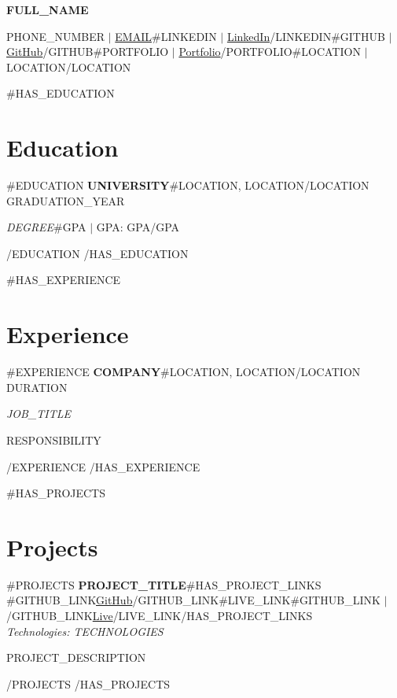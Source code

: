 \documentclass[10pt,letterpaper]{article}
\begin{document}
\begin{center}
{\Large \textbf{\uppercase{{{FULL_NAME}}}}}

\vspace{2pt}
{\small {{PHONE_NUMBER}} $|$ \href{mailto:{{EMAIL}}}{{{EMAIL}}}{{#LINKEDIN}} $|$ \href{{{LINKEDIN}}}{LinkedIn}{{/LINKEDIN}}{{#GITHUB}} $|$ \href{{{GITHUB}}}{GitHub}{{/GITHUB}}{{#PORTFOLIO}} $|$ \href{{{PORTFOLIO}}}{Portfolio}{{/PORTFOLIO}}{{#LOCATION}} $|$ {{LOCATION}}{{/LOCATION}}}
\end{center}

{{#HAS_EDUCATION}}
\section*{Education}
{{#EDUCATION}}
\textbf{{{UNIVERSITY}}}{{#LOCATION}}, {{LOCATION}}{{/LOCATION}} \hfill {{GRADUATION_YEAR}}

\textit{{{DEGREE}}}{{#GPA}} $|$ GPA: {{GPA}}{{/GPA}}

{{/EDUCATION}}
{{/HAS_EDUCATION}}

{{#HAS_EXPERIENCE}}
\section*{Experience}
{{#EXPERIENCE}}
\textbf{{{COMPANY}}}{{#LOCATION}}, {{LOCATION}}{{/LOCATION}} \hfill {{DURATION}}

\textit{{{JOB_TITLE}}}
\begin{itemize}
{{RESPONSIBILITY}}
\end{itemize}

{{/EXPERIENCE}}
{{/HAS_EXPERIENCE}}

{{#HAS_PROJECTS}}
\section*{Projects}
{{#PROJECTS}}
\textbf{{{PROJECT_TITLE}}}{{#HAS_PROJECT_LINKS}} \hfill{{#GITHUB_LINK}}\href{{{GITHUB_LINK}}}{GitHub}{{/GITHUB_LINK}}{{#LIVE_LINK}}{{#GITHUB_LINK}} $|$ {{/GITHUB_LINK}}\href{{{LIVE_LINK}}}{Live}{{/LIVE_LINK}}{{/HAS_PROJECT_LINKS}}
\\{\small\textit{Technologies: {{{TECHNOLOGIES}}}}}
\begin{itemize}
{{PROJECT_DESCRIPTION}}
\end{itemize}

{{/PROJECTS}}
{{/HAS_PROJECTS}}
\end{document}
